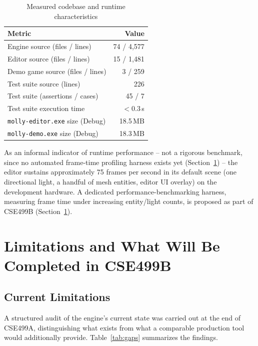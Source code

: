 \documentclass[conference]{IEEEtran}
\begin{document}
\begin{table}[htbp]
\caption{Measured codebase and runtime characteristics}
\label{tab:results}
\centering
\begin{tabular}{lr}
\toprule
\textbf{Metric} & \textbf{Value} \\
\midrule
Engine source (files / lines) & 74 / 4{,}577 \\
Editor source (files / lines) & 15 / 1{,}481 \\
Demo game source (files / lines) & 3 / 259 \\
Test suite source (lines) & 226 \\
Test suite (assertions / cases) & 45 / 7 \\
Test suite execution time & $<$0.3\,s \\
\texttt{molly-editor.exe} size (Debug) & 18.5\,MB \\
\texttt{molly-demo.exe} size (Debug) & 18.3\,MB \\
\bottomrule
\end{tabular}
\end{table}

As an informal indicator of runtime performance -- not a rigorous
benchmark, since no automated frame-time profiling harness exists yet
(Section~\ref{sec:limitations}) -- the editor sustains approximately
75 frames per second in its default scene (one directional light, a
handful of mesh entities, editor UI overlay) on the development
hardware. A dedicated performance-benchmarking harness, measuring frame
time under increasing entity/light counts, is proposed as part of
CSE499B (Section~\ref{sec:limitations}).

\section{Limitations and What Will Be Completed in CSE499B}
\label{sec:limitations}

\subsection{Current Limitations}
\label{sec:current-limitations}

A structured audit of the engine's current state was carried out at the
end of CSE499A, distinguishing what exists from what a comparable
production tool would additionally provide. Table~\ref{tab:gaps}
summarizes the findings.
\end{document}
